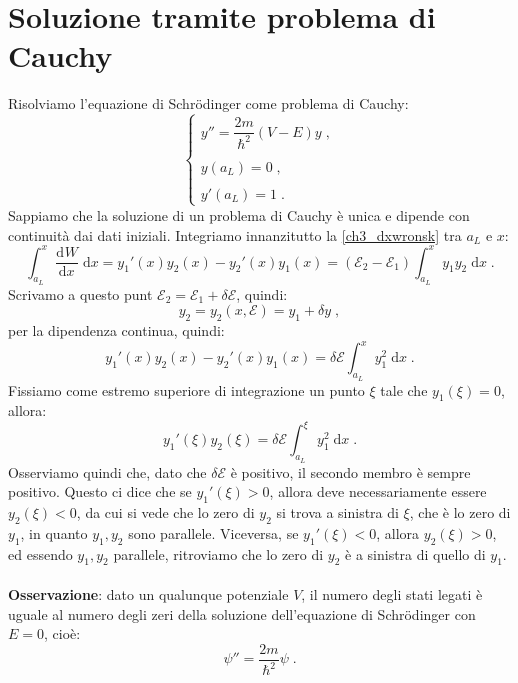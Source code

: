 \documentclass[12pt,a4paper]{report}
\theoremstyle{definition}
\newcommand{\dev}[3][]{\frac{\mathrm{d}^{#1} #2}{\mathrm{d} #3^{#1}}}
\numberwithin{equation}{section}
\newcommand{\diff}[1][]{\mathrm{d}#1}
\begin{document}
\section{Soluzione tramite problema di Cauchy}
Risolviamo l'equazione di Schrödinger come problema di Cauchy:
\begin{equation}
\begin{cases}
y''=\dfrac{2m}{\hbar^2}(V-E)y\;, \\
\\
y(a_L)=0\;, \\
\\
y'(a_L)=1\;.
\end{cases}
\end{equation}
Sappiamo che la soluzione di un problema di Cauchy è unica e dipende con continuità dai dati iniziali. Integriamo innanzitutto la \eqref{ch3_dxwronsk} tra $a_L$ e $x$:
$$
\int_{a_L}^x \dev{W}{x}\;\diff{x}=
y_1'(x)y_2(x)-y_2'(x)y_1(x)=(\mathcal{E}_2-\mathcal{E}_1)\int_{a_L}^x y_1y_2\;\diff{x}\;.
$$
Scrivamo a questo punt $\mathcal{E}_2=\mathcal{E}_1+\delta\mathcal{E}$, quindi:
$$
y_2=y_2(x,\mathcal{E})=y_1+\delta y\;,
$$
per la dipendenza continua, quindi:
$$
y_1'(x)y_2(x)-y_2'(x)y_1(x)=\delta\mathcal{E}\int_{a_L}^x y_1^2\;\diff{x}\;.
$$
Fissiamo come estremo superiore di integrazione un punto $\xi$ tale che $y_1(\xi)=0$, allora:
\begin{equation}
y_1'(\xi)y_2(\xi)=\delta\mathcal{E}\int_{a_L}^{\xi}y_1^2\;\diff{x}\;.
\end{equation}
Osserviamo quindi che, dato che $\delta\mathcal{E}$ è positivo, il secondo membro è sempre positivo. Questo ci dice che se $y_1'(\xi)>0$, allora deve necessariamente essere $y_2(\xi)<0$, da cui si vede che lo zero di $y_2$ si trova a sinistra di $\xi$, che è lo zero di $y_1$, in quanto $y_1,y_2$ sono parallele. Viceversa, se $y_1'(\xi)<0$, allora $y_2(\xi)>0$, ed essendo $y_1,y_2$ parallele, ritroviamo che lo zero di $y_2$ è a sinistra di quello di $y_1$. \\
\\
\textbf{Osservazione}: dato un qualunque potenziale $V$, il numero degli stati legati è uguale al numero degli zeri della soluzione dell'equazione di Schrödinger con $E=0$, cioè:
\begin{equation}
\psi''=\frac{2m}{\hbar^2}\psi\;.
\end{equation}
\end{document}
